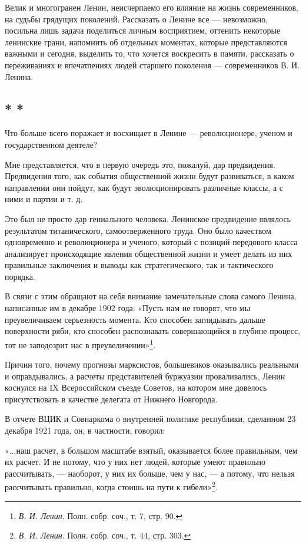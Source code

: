 \documentclass[12pt, a4paper, openany]{book}
\begin{document}
Велик и многогранен Ленин, неисчерпаемо его влияние на жизнь современников, на судьбы грядущих поколений. Рассказать о Ленине все — невозможно, посильна лишь задача поделиться личным восприятием, оттенить некоторые ленинские грани, напомнить об отдельных моментах, которые представляются важными и сегодня, выделить то, что хочется воскресить в памяти, рассказать о переживаниях и впечатлениях людей старшего поколения — современников В. И. Ленина.

\subsection*{\center * * *}

Что больше всего поражает и восхищает в Ленине — революционере, ученом и государственном деятеле?

Мне представляется, что в первую очередь это, пожалуй, дар предвидения. Предвидения того, как события общественной жизни будут развиваться, в каком направлении они пойдут, как будут эволюционировать различные классы, а с ними и партии и т. д.

Это был не просто дар гениального человека. Ленинское предвидение являлось результатом титанического, самоотверженного труда. Оно было качеством одновременно и революционера и ученого, который с позиций передового класса анализирует происходящие явления общественной жизни и умеет делать из них правильные заключения и выводы как стратегического, так и тактического порядка.

В связи с этим обращают на себя внимание замечательные слова самого Ленина, написанные им в декабре 1902 года: «Пусть нам не говорят, что мы преувеличиваем серьезность момента. Кто способен заглядывать дальше поверхности ряби, кто способен распознавать совершающийся в глубине процесс, тот не заподозрит нас в преувеличении»\footnote{\textit{В. И. Ленин}. Полн. собр. соч., т. 7, стр. 90.}.

Причин того, почему прогнозы марксистов, большевиков оказывались реальными и оправдывались, а расчеты представителей буржуазии проваливались, Ленин коснулся на IX Всероссийском съезде Советов, на котором мне довелось присутствовать в качестве делегата от Нижнего Новгорода.

В отчете ВЦИК и Совнаркома о внутренней политике республики, сделанном 23 декабря 1921 года, он, в частности, говорил:

«...наш расчет, в большом масштабе взятый, оказывается более правильным, чем их расчет. И не потому, что у них нет людей, которые умеют правильно рассчитывать, — наоборот, у них их больше, чем у нас, — а потому, что нельзя рассчитывать правильно, когда стоишь на пути к гибели»\footnote{\textit{В. И. Ленин}. Полн. собр. соч., т. 44, стр. 303.}.
\end{document}
